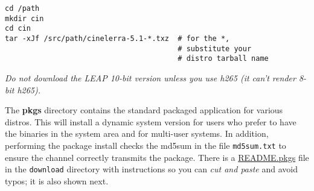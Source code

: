 \begin{lstlisting}[style=sh]
cd /path
mkdir cin
cd cin
tar -xJf /src/path/cinelerra-5.1-*.txz  # for the *,
                                        # substitute your
                                        # distro tarball name
\end{lstlisting}

\emph{Do not download the LEAP 10-bit version unless you use h265 (it
can't render 8-bit h265).}

The \textbf{pkgs} directory contains the standard packaged
application for various distros.  This will install a dynamic
system version for users who prefer to have the binaries in the
system area and for multi-user systems.
%
In addition, performing the package install checks the md5sum in
the file \texttt{md5sum.txt} to ensure the channel correctly
transmits the package.  There is a
\href{https://cinelerra-gg.org/download/README.pkgs}{README.pkgs}
file in the \texttt{download} directory with instructions so you
can \textit{ cut and paste} and avoid typos; it is also shown
next.

